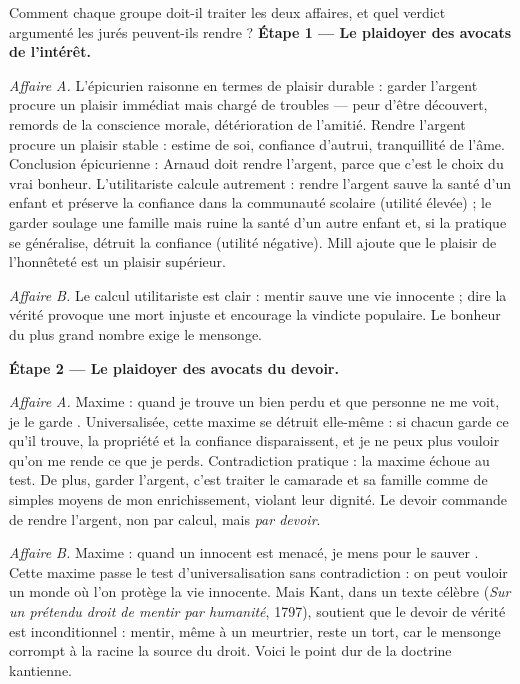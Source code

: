 \documentclass[11pt]{article}
\begin{document}
\begin{exoresolu}
Comment chaque groupe doit-il traiter les deux affaires, et quel verdict argumenté les jurés peuvent-ils rendre ?
\tcblower
\textbf{Étape 1 — Le plaidoyer des avocats de l'intérêt.}

\emph{Affaire A.} L'épicurien raisonne en termes de plaisir durable : garder l'argent procure un plaisir immédiat mais chargé de troubles — peur d'être découvert, remords de la conscience morale, détérioration de l'amitié. Rendre l'argent procure un plaisir stable : estime de soi, confiance d'autrui, tranquillité de l'âme. Conclusion épicurienne : Arnaud doit rendre l'argent, parce que c'est le choix du vrai bonheur. L'utilitariste calcule autrement : rendre l'argent sauve la santé d'un enfant et préserve la confiance dans la communauté scolaire (utilité élevée) ; le garder soulage une famille mais ruine la santé d'un autre enfant et, si la pratique se généralise, détruit la confiance (utilité négative). Mill ajoute que le plaisir de l'honnêteté est un plaisir supérieur.

\emph{Affaire B.} Le calcul utilitariste est clair : mentir sauve une vie innocente ; dire la vérité provoque une mort injuste et encourage la vindicte populaire. Le bonheur du plus grand nombre exige le mensonge.

\textbf{Étape 2 — Le plaidoyer des avocats du devoir.}

\emph{Affaire A.} Maxime : \guillemotleft quand je trouve un bien perdu et que personne ne me voit, je le garde \guillemotright. Universalisée, cette maxime se détruit elle-même : si chacun garde ce qu'il trouve, la propriété et la confiance disparaissent, et je ne peux plus vouloir qu'on me rende ce que je perds. Contradiction pratique : la maxime échoue au test. De plus, garder l'argent, c'est traiter le camarade et sa famille comme de simples moyens de mon enrichissement, violant leur dignité. Le devoir commande de rendre l'argent, non par calcul, mais \emph{par devoir}.

\emph{Affaire B.} Maxime : \guillemotleft quand un innocent est menacé, je mens pour le sauver \guillemotright. Cette maxime passe le test d'universalisation sans contradiction : on peut vouloir un monde où l'on protège la vie innocente. Mais Kant, dans un texte célèbre (\emph{Sur un prétendu droit de mentir par humanité}, 1797), soutient que le devoir de vérité est inconditionnel : mentir, même à un meurtrier, reste un tort, car le mensonge corrompt à la racine la source du droit. Voici le point dur de la doctrine kantienne.


\end{exoresolu}
\end{document}
